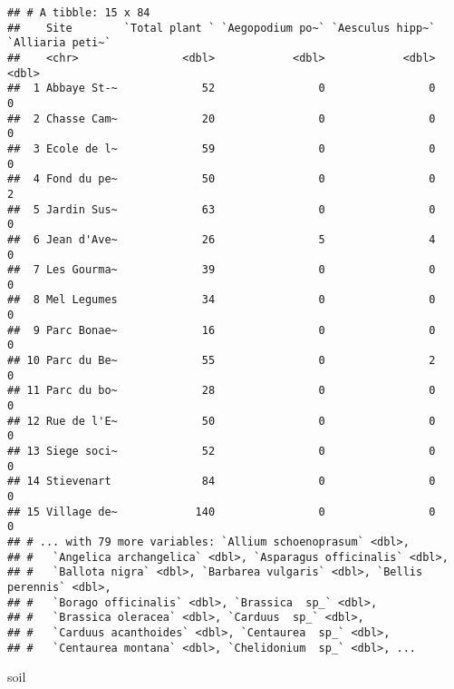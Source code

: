 \documentclass[
]{article}
\newenvironment{Shaded}{\begin{snugshade}}{\end{snugshade}}
\newcommand{\NormalTok}[1]{#1}
\begin{document}
\begin{verbatim}
## # A tibble: 15 x 84
##    Site        `Total plant ` `Aegopodium po~` `Aesculus hipp~` `Alliaria peti~`
##    <chr>                <dbl>            <dbl>            <dbl>            <dbl>
##  1 Abbaye St-~             52                0                0                0
##  2 Chasse Cam~             20                0                0                0
##  3 Ecole de l~             59                0                0                0
##  4 Fond du pe~             50                0                0                2
##  5 Jardin Sus~             63                0                0                0
##  6 Jean d'Ave~             26                5                4                0
##  7 Les Gourma~             39                0                0                0
##  8 Mel Legumes             34                0                0                0
##  9 Parc Bonae~             16                0                0                0
## 10 Parc du Be~             55                0                2                0
## 11 Parc du bo~             28                0                0                0
## 12 Rue de l'E~             50                0                0                0
## 13 Siege soci~             52                0                0                0
## 14 Stievenart              84                0                0                0
## 15 Village de~            140                0                0                0
## # ... with 79 more variables: `Allium schoenoprasum` <dbl>,
## #   `Angelica archangelica` <dbl>, `Asparagus officinalis` <dbl>,
## #   `Ballota nigra` <dbl>, `Barbarea vulgaris` <dbl>, `Bellis perennis` <dbl>,
## #   `Borago officinalis` <dbl>, `Brassica  sp_` <dbl>,
## #   `Brassica oleracea` <dbl>, `Carduus  sp_` <dbl>,
## #   `Carduus acanthoides` <dbl>, `Centaurea  sp_` <dbl>,
## #   `Centaurea montana` <dbl>, `Chelidonium  sp_` <dbl>, ...
\end{verbatim}

\begin{Shaded}
\begin{Highlighting}[]
\NormalTok{soil}
\end{Highlighting}
\end{Shaded}
\end{document}
